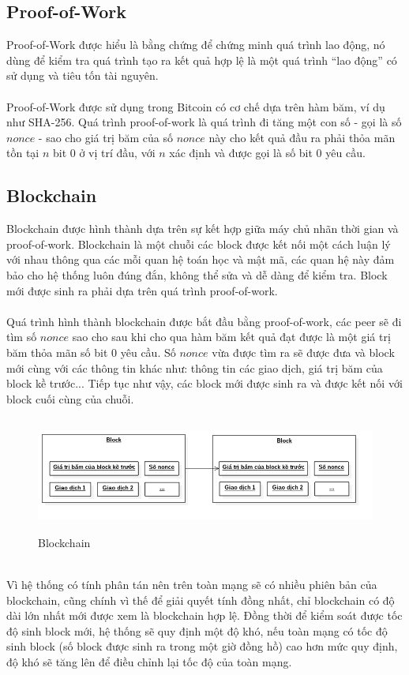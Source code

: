 \subsection{Proof-of-Work}
Proof-of-Work được hiểu là bằng chứng để chứng minh quá trình lao động, nó dùng 
để kiểm tra quá trình tạo ra kết quả hợp lệ là một quá trình ``lao động'' có 
sử dụng và tiêu tốn tài nguyên.\\\\
Proof-of-Work được sử dụng trong Bitcoin có cơ chế dựa trên hàm băm, ví dụ như 
SHA-256. Quá trình proof-of-work là quá trình đi tăng một con số - gọi là số 
$nonce$ - sao cho giá trị băm của số $nonce$ này cho kết quả đầu ra phải thỏa 
mãn tồn tại $n$ bit 0 ở vị trí đầu, với $n$ xác định và được gọi là số bit 0 
yêu cầu.
\subsection{Blockchain}
Blockchain được hình thành dựa trên sự kết hợp giữa máy chủ nhãn thời gian và 
proof-of-work. Blockchain là một chuỗi các block được kết nối một cách luận lý 
với nhau thông qua các mỗi quan hệ toán học và mật mã, các quan hệ này đảm bảo 
cho hệ thống luôn đúng đắn, không thể sửa và dễ dàng để kiểm tra. Block mới được 
sinh ra phải dựa trên quá trình proof-of-work.\\\\
Quá trình hình thành blockchain được bắt đầu bằng proof-of-work, các peer sẽ đi
tìm số $nonce$ sao cho sau khi cho qua hàm băm kết quả đạt được là một giá trị 
băm thỏa mãn số bit 0 yêu cầu. Số $nonce$ vừa được tìm ra sẽ được đưa và block
mới cùng với các thông tin khác như: thông tin các giao dịch, giá trị băm của 
block kề trước... Tiếp tục như vậy, các block mới được sinh ra và được kết nối 
với block cuối cùng của chuỗi.\\
\begin{figure}[h!]
\centering
\includegraphics[height=1.5in, keepaspectratio=true]{blockchain.png}
\caption{Blockchain}
\end{figure}\\
Vì hệ thống có tính phân tán nên trên toàn mạng sẽ có nhiều phiên bản của blockchain,
cũng chính vì thế để giải quyết tính đồng nhất, chỉ blockchain có độ dài lớn 
nhất mới được xem là blockchain hợp lệ. Đồng thời để kiểm soát được tốc độ sinh
block mới, hệ thống sẽ quy định một độ khó, nếu toàn mạng có tốc độ sinh block 
(số block được sinh ra trong một giờ đồng hồ) cao hơn mức quy định, độ khó sẽ tăng lên 
để điều chỉnh lại tốc độ của toàn mạng.
